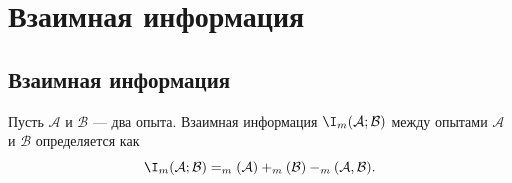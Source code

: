 %
%
%
%
%

\section{Взаимная информация}
\localtableofcontents

\subsection{Взаимная информация}

\begin{definition}
	Пусть \(\mathcal{A}\) и \(\mathcal{B}\) --- два опыта. Взаимная информация \(\I_m(\mathcal{A};\mathcal{B})\) между опытами $\mathcal{A}$ и $\mathcal{B}$ определяется как
	\[
    	\I_m(\mathcal{A};\mathcal{B}) = \H_m(\mathcal{A}) + \H_m(\mathcal{B}) - \H_m(\mathcal{A},\mathcal{B}).
	\]
\end{definition}

